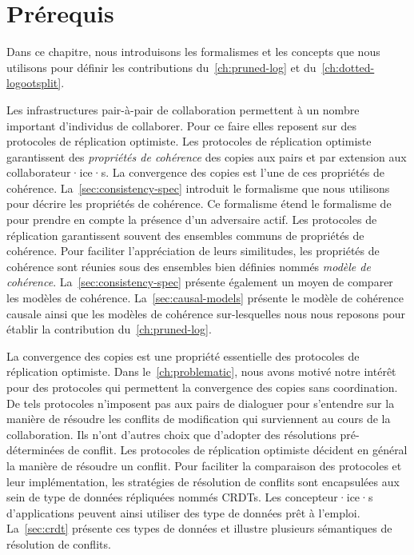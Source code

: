 
\chapter{Prérequis}\label{ch:background}

\minitoc{}
\bigskip

Dans ce chapitre, nous introduisons les formalismes et les concepts que nous utilisons pour définir les contributions du~\autoref{ch:pruned-log} et du~\autoref{ch:dotted-logootsplit}.

Les infrastructures pair-à-pair de collaboration permettent à un nombre important d'individus de collaborer.
Pour ce faire elles reposent sur des protocoles de réplication optimiste.
Les protocoles de réplication optimiste garantissent des \emph{propriétés de cohérence} des copies aux pairs et par extension aux collaborateur·ice·s.
La convergence des copies est l'une de ces propriétés de cohérence.
La~\autoref{sec:consistency-spec} introduit le formalisme que nous utilisons pour décrire les propriétés de cohérence.
Ce formalisme étend le formalisme de~\textcite{burckhardt_eventualconsistency_2014} pour prendre en compte la présence d'un adversaire actif.
Les protocoles de réplication garantissent souvent des ensembles communs de propriétés de cohérence.
Pour faciliter l'appréciation de leurs similitudes, les propriétés de cohérence sont réunies sous des ensembles bien définies nommés \emph{modèle de cohérence}.
La~\autoref{sec:consistency-spec} présente également un moyen de comparer les modèles de cohérence.
La~\autoref{sec:causal-models} présente le modèle de cohérence causale ainsi que les modèles de cohérence sur-lesquelles nous nous reposons pour établir la contribution du~\autoref{ch:pruned-log}.

La convergence des copies est une propriété essentielle des protocoles de réplication optimiste.
Dans le~\autoref{ch:problematic}, nous avons motivé notre intérêt pour des protocoles qui permettent la convergence des copies sans coordination.
De tels protocoles n'imposent pas aux pairs de dialoguer pour s'entendre sur la manière de résoudre les conflits de modification qui surviennent au cours de la collaboration.
Ils n'ont d'autres choix que d'adopter des résolutions pré-déterminées de conflit.
Les protocoles de réplication optimiste décident en général la manière de résoudre un conflit.
Pour faciliter la comparaison des protocoles et leur implémentation, les stratégies de résolution de conflits sont encapsulées aux sein de type de données répliquées nommés \acfp{CRDT}.
Les concepteur·ice·s d'applications peuvent ainsi utiliser des type de données prêt à l'emploi.
La~\autoref{sec:crdt} présente ces types de données et illustre plusieurs sémantiques de résolution de conflits.

